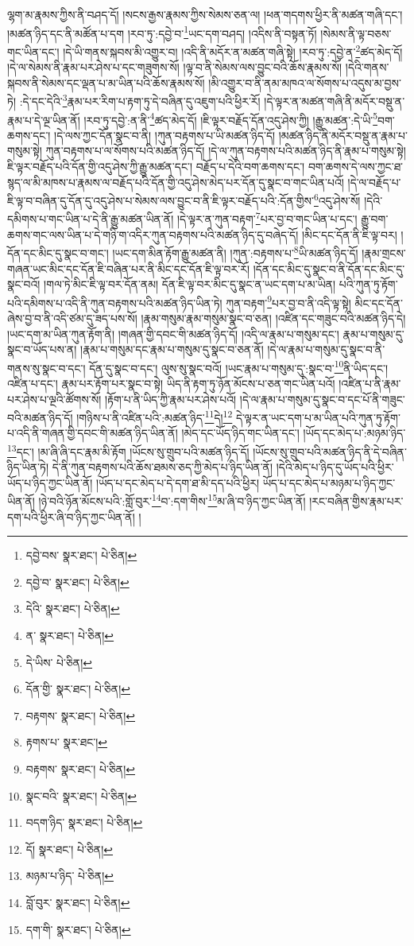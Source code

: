 ལྷག་མ་རྣམས་ཀྱིས་ནི་བཤད་དོ། །སངས་རྒྱས་རྣམས་ཀྱིས་སེམས་ཅན་ལ། །ཕན་གདགས་ཕྱིར་ནི་མཚན་གཞི་དང་། །མཚན་ཉིད་དང་ནི་མཚོན་པ་དག །རབ་ཏུ་:དབྱེ་བ་\footnote{དབྱེ་བས་  སྣར་ཐང་།  པེ་ཅིན། }ཡང་དག་བཤད། །འདིས་ནི་བསྟན་ཏོ། །སེམས་ནི་ལྟ་བཅས་གང་ཡིན་དང་། །དེ་ཡི་གནས་སྐབས་མི་འགྱུར་བ། །འདི་ནི་མདོར་ན་མཚན་གཞི་སྟེ། །རབ་ཏུ་:དབྱེ་ན་\footnote{དབྱེ་བ་  སྣར་ཐང་།  པེ་ཅིན། }ཚད་མེད་དོ། །དེ་ལ་སེམས་ནི་རྣམ་པར་ཤེས་པ་དང་གཟུགས་སོ། །ལྟ་བ་ནི་སེམས་ལས་བྱུང་བའི་ཆོས་རྣམས་སོ། །དེའི་གནས་སྐབས་ནི་སེམས་དང་ལྡན་པ་མ་ཡིན་པའི་ཆོས་རྣམས་སོ། །མི་འགྱུར་བ་ནི་ནམ་མཁའ་ལ་སོགས་པ་འདུས་མ་བྱས་ཏེ། :དེ་དང་དེའི་\footnote{དེའི་  སྣར་ཐང་།  པེ་ཅིན། }རྣམ་པར་རིག་པ་རྟག་ཏུ་དེ་བཞིན་དུ་འཇུག་པའི་ཕྱིར་རོ། །དེ་ལྟར་ན་མཚན་གཞི་ནི་མདོར་བསྡུ་ན་རྣམ་པ་དེ་ལྔ་ཡིན་ནོ། །རབ་ཏུ་དབྱེ་:ན་ནི་\footnote{ན་  སྣར་ཐང་།  པེ་ཅིན། }ཚད་མེད་དོ། །ཇི་ལྟར་བརྗོད་དོན་འདུ་ཤེས་ཀྱི། །རྒྱུ་མཚན་:དེ་ཡི་\footnote{དེ་ཡིས་  པེ་ཅིན། }བག་ཆགས་དང་། །དེ་ལས་ཀྱང་དོན་སྣང་བ་ནི། །ཀུན་བརྟགས་པ་ཡི་མཚན་ཉིད་དོ། །མཚན་ཉིད་ནི་མདོར་བསྡུ་ན་རྣམ་པ་གསུམ་སྟེ། ཀུན་བརྟགས་པ་ལ་སོགས་པའི་མཚན་ཉིད་དོ། །དེ་ལ་ཀུན་བརྟགས་པའི་མཚན་ཉིད་ནི་རྣམ་པ་གསུམ་སྟེ། ཇི་ལྟར་བརྗོད་པའི་དོན་གྱི་འདུ་ཤེས་ཀྱི་རྒྱུ་མཚན་དང་། བརྗོད་པ་དེའི་བག་ཆགས་དང་། བག་ཆགས་དེ་ལས་ཀྱང་ཐ་སྙད་ལ་མི་མཁས་པ་རྣམས་ལ་བརྗོད་པའི་དོན་གྱི་འདུ་ཤེས་མེད་པར་དོན་དུ་སྣང་བ་གང་ཡིན་པའོ། །དེ་ལ་བརྗོད་པ་ཇི་ལྟ་བ་བཞིན་དུ་དོན་དུ་འདུ་ཤེས་པ་སེམས་ལས་བྱུང་བ་ནི་ཇི་ལྟར་བརྗོད་པའི་:དོན་གྱིས་\footnote{དོན་གྱི་  སྣར་ཐང་།  པེ་ཅིན། }འདུ་ཤེས་སོ། །དེའི་དམིགས་པ་གང་ཡིན་པ་དེ་ནི་རྒྱུ་མཚན་ཡིན་ནོ། །དེ་ལྟར་ན་ཀུན་བརྟག་\footnote{བརྟགས་  སྣར་ཐང་།  པེ་ཅིན། }པར་བྱ་བ་གང་ཡིན་པ་དང་། རྒྱུ་བག་ཆགས་གང་ལས་ཡིན་པ་དེ་གཉི་ག་འདིར་ཀུན་བརྟགས་པའི་མཚན་ཉིད་དུ་བཞེད་དོ། །མིང་དང་དོན་ནི་ཇི་ལྟ་བར། །དོན་དང་མིང་དུ་སྣང་བ་གང་། །ཡང་དག་མིན་རྟོག་རྒྱུ་མཚན་ནི། །ཀུན་:བརྟགས་པ་\footnote{རྟགས་པ་  སྣར་ཐང་། }ཡི་མཚན་ཉིད་དོ། །རྣམ་གྲངས་གཞན་ཡང་མིང་དང་དོན་ཇི་བཞིན་པར་ནི་མིང་དང་དོན་ཇི་ལྟ་བར་རོ། །དོན་དང་མིང་དུ་སྣང་བ་ནི་དོན་དང་མིང་དུ་སྣང་བའོ། །གལ་ཏེ་མིང་ཇི་ལྟ་བར་དོན་ནམ། དོན་ཇི་ལྟ་བར་མིང་དུ་སྣང་ན་ཡང་དག་པ་མ་ཡིན། པའི་ཀུན་ཏུ་རྟོག་པའི་དམིགས་པ་འདི་ནི་ཀུན་བརྟགས་པའི་མཚན་ཉིད་ཡིན་ཏེ། ཀུན་བརྟག་\footnote{བརྟགས་  སྣར་ཐང་།  པེ་ཅིན། }པར་བྱ་བ་ནི་འདི་ལྟ་སྟེ། མིང་དང་དོན་ཞེས་བྱ་བ་ནི་འདི་ཙམ་དུ་ཟད་པས་སོ། །རྣམ་གསུམ་རྣམ་གསུམ་སྣང་བ་ཅན། །འཛིན་དང་གཟུང་བའི་མཚན་ཉིད་དེ། །ཡང་དག་མ་ཡིན་ཀུན་རྟོག་ནི། །གཞན་གྱི་དབང་གི་མཚན་ཉིད་དོ། །འདི་ལ་རྣམ་པ་གསུམ་དང་། རྣམ་པ་གསུམ་དུ་སྣང་བ་ཡོད་པས་ན། །རྣམ་པ་གསུམ་དང་རྣམ་པ་གསུམ་དུ་སྣང་བ་ཅན་ནོ། །དེ་ལ་རྣམ་པ་གསུམ་དུ་སྣང་བ་ནི་གནས་སུ་སྣང་བ་དང་། དོན་དུ་སྣང་བ་དང་། ལུས་སུ་སྣང་བའོ། །ཡང་རྣམ་པ་གསུམ་དུ་:སྣང་བ་\footnote{སྣང་བའི་  སྣར་ཐང་།  པེ་ཅིན། }ནི་ཡིད་དང་། འཛིན་པ་དང་། རྣམ་པར་རྟོག་པར་སྣང་བ་སྟེ། ཡིད་ནི་རྟག་ཏུ་ཉོན་མོངས་པ་ཅན་གང་ཡིན་པའོ། །འཛིན་པ་ནི་རྣམ་པར་ཤེས་པ་ལྔའི་ཚོགས་སོ། །རྟོག་པ་ནི་ཡིད་ཀྱི་རྣམ་པར་ཤེས་པའོ། །དེ་ལ་རྣམ་པ་གསུམ་དུ་སྣང་བ་དང་པོ་ནི་གཟུང་བའི་མཚན་ཉིད་དོ། །གཉིས་པ་ནི་འཛིན་པའི་:མཚན་ཉིད་\footnote{བདག་ཉིད་  སྣར་ཐང་།  པེ་ཅིན། }དེ།\footnote{དོ།  སྣར་ཐང་།  པེ་ཅིན། } དེ་ལྟར་ན་ཡང་དག་པ་མ་ཡིན་པའི་ཀུན་ཏུ་རྟོག་པ་འདི་ནི་གཞན་གྱི་དབང་གི་མཚན་ཉིད་ཡིན་ནོ། །མེད་དང་ཡོད་ཉིད་གང་ཡིན་དང་། །ཡོད་དང་མེད་པ་:མཉམ་ཉིད་\footnote{མཉམ་པ་ཉིད་  པེ་ཅིན། }དང་། །མ་ཞི་ཞི་དང་རྣམ་མི་རྟོག །ཡོངས་སུ་གྲུབ་པའི་མཚན་ཉིད་དོ། །ཡོངས་སུ་གྲུབ་པའི་མཚན་ཉིད་ནི་དེ་བཞིན་ཉིད་ཡིན་ཏེ། དེ་ནི་ཀུན་བརྟགས་པའི་ཆོས་ཐམས་ཅད་ཀྱི་མེད་པ་ཉིད་ཡིན་ནོ། །དེའི་མེད་པ་ཉིད་དུ་ཡོད་པའི་ཕྱིར་ཡོད་པ་ཉིད་ཀྱང་ཡིན་ནོ། །ཡོད་པ་དང་མེད་པ་དེ་དག་ཐ་མི་དད་པའི་ཕྱིར། ཡོད་པ་དང་མེད་པ་མཉམ་པ་ཉིད་ཀྱང་ཡིན་ནོ། །ཉེ་བའི་ཉོན་མོངས་པའི་:གློ་བུར་\footnote{བློ་བུར་  སྣར་ཐང་།  པེ་ཅིན། }བ་:དག་གིས་\footnote{དག་གི་  སྣར་ཐང་།  པེ་ཅིན། }མ་ཞི་བ་ཉིད་ཀྱང་ཡིན་ནོ། །རང་བཞིན་གྱིས་རྣམ་པར་དག་པའི་ཕྱིར་ཞི་བ་ཉིད་ཀྱང་ཡིན་ནོ། །
